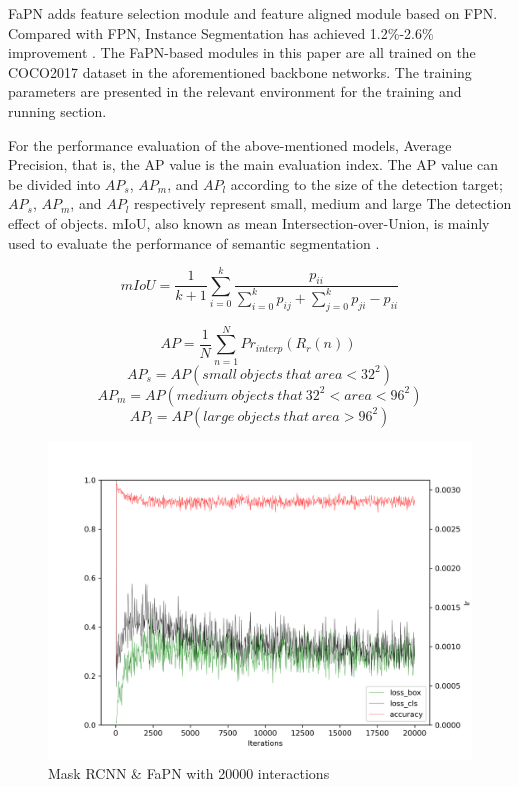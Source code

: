FaPN adds feature selection module \cite{hu2018squeeze} and feature aligned module based on FPN. Compared with FPN, Instance Segmentation has achieved 1.2\%-2.6\% improvement \cite{huang2021fapn}. The FaPN-based modules in this paper are all trained on the COCO2017 dataset in the aforementioned backbone networks. The training parameters are presented in the relevant environment for the training and running section.


For the performance evaluation of the above-mentioned models, Average Precision, that is, the AP value is the main evaluation index. The AP value can be divided into $AP_s$, $AP_m$, and $AP_l$ according to the size of the detection target; $AP_s$, $AP_m$, and $AP_l$ respectively represent small, medium and large The detection effect of objects. mIoU, also known as mean Intersection-over-Union, is mainly used to evaluate the performance of semantic segmentation \cite{padilla2021comparative}.

$$ mIoU = \frac{1}{k+1} \sum_{i=0}^{k}\frac{p_{ii}}{\sum_{i=0}^{k}p_{ij}+\sum_{j=0}^{k}p_{ji}-p_{ii}}$$

$$AP = \frac{1}{N}\sum_{n=1}^{N}Pr_{interp}(R_r(n))\ $$
$$AP_s = AP (small\ objects\ that\ area < 32^2)$$
$$AP_m = AP (medium\ objects\ that\ 32^2 < area < 96^2)$$
$$AP_l = AP (large\ objects\ that\ area > 96^2)$$

\begin{figure}[htb]
    \centering
    \includegraphics[width=1\textwidth]{figures/mask_rcnn_r_50_fapn_1x_20000iter.png}
    \caption{Mask RCNN \& FaPN with 20000 interactions}\label{mask_rcnn_r_50_fapn_1x_20000iter}
\end{figure}

